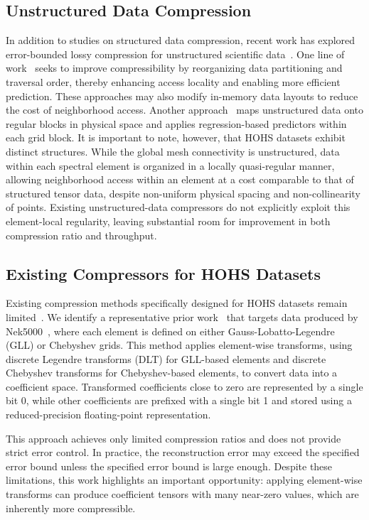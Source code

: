\subsection{Unstructured Data Compression}

In addition to studies on structured data compression, recent work has explored error-bounded lossy compression for unstructured scientific data~\cite{ajtai2002compactly,patil2018survey,salloum2018optimal,ren2024prediction,gong2024general,wu2025enabling,li2024msz}.
One line of work~\cite{wu2025enabling,ren2024prediction} seeks to improve compressibility by reorganizing data partitioning and traversal order, thereby enhancing access locality and enabling more efficient prediction. 
These approaches may also modify in-memory data layouts to reduce the cost of neighborhood access. 
Another approach~\cite{gong2024general} maps unstructured data onto regular blocks in physical space and applies regression-based predictors within each grid block.
It is important to note, however, that HOHS datasets exhibit distinct structures. While the global mesh connectivity is unstructured, data within each spectral element is organized in a locally quasi-regular manner, allowing neighborhood access within an element at a cost comparable to that of structured tensor data, despite non-uniform physical spacing and non-collinearity of points. Existing unstructured-data compressors do not explicitly exploit this element-local regularity, leaving substantial room for improvement in both compression ratio and throughput.

\subsection{Existing Compressors for HOHS Datasets}\label{sec:related work:prior work}

Existing compression methods specifically designed for HOHS datasets remain limited~\cite{marin2016spectral,liu2024parallel,zniyed2024enhanced}. 
We identify a representative prior work~\cite{marin2016spectral} that targets data produced by Nek5000~\cite{nek5000-web-page}, where each element is defined on either Gauss-Lobatto-Legendre (GLL) or Chebyshev grids. This method applies element-wise transforms, using discrete Legendre transforms (DLT) for GLL-based elements and discrete Chebyshev transforms for Chebyshev-based elements, to convert data into a coefficient space. Transformed coefficients close to zero are represented by a single bit 0, while other coefficients are prefixed with a single bit 1 and stored using a reduced-precision floating-point representation.

This approach achieves only limited compression ratios and does not provide strict error control. In practice, the reconstruction error may exceed the specified error bound unless the specified error bound is large enough. Despite these limitations, this work highlights an important opportunity: applying element-wise transforms can produce coefficient tensors with many near-zero values, which are inherently more compressible. 